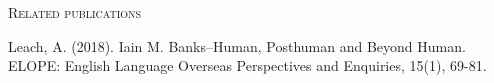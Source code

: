 {\LARGE\textsc{Related publications}}

\par \vspace{10mm}

Leach, A. (2018). Iain M. Banks–Human, Posthuman and Beyond Human. ELOPE: English Language Overseas Perspectives and Enquiries, 15(1), 69-81.

